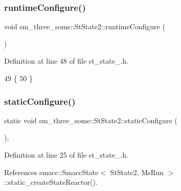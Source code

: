 \subsubsection{\texorpdfstring{runtime\+Configure()}{runtimeConfigure()}}
{\footnotesize\ttfamily void sm\+\_\+three\+\_\+some\+::\+St\+State2\+::runtime\+Configure (\begin{DoxyParamCaption}{ }\end{DoxyParamCaption})\hspace{0.3cm}{\ttfamily [inline]}}



Definition at line 48 of file st\+\_\+state\+\_.\+h.


\begin{DoxyCode}
49     \{
50     \}
\end{DoxyCode}
\mbox{\label{structsm__three__some_1_1StState2_af07ae40962e343ce9605288f0ebad82b}} 
\subsubsection{\texorpdfstring{static\+Configure()}{staticConfigure()}}
{\footnotesize\ttfamily static void sm\+\_\+three\+\_\+some\+::\+St\+State2\+::static\+Configure (\begin{DoxyParamCaption}{ }\end{DoxyParamCaption})\hspace{0.3cm}{\ttfamily [inline]}, {\ttfamily [static]}}



Definition at line 25 of file st\+\_\+state\+\_.\+h.



References smacc\+::\+Smacc\+State$<$ St\+State2, Ms\+Run $>$\+::static\+\_\+create\+State\+Reactor().


